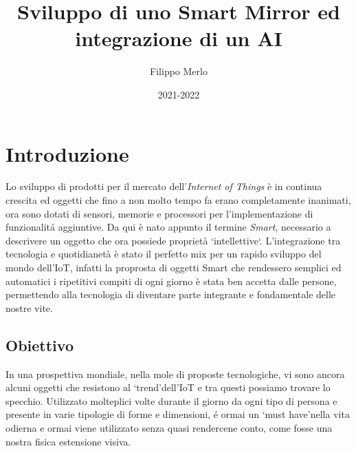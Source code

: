\documentclass[12pt,a4paper]{article}
\title{Sviluppo di uno Smart Mirror ed integrazione di un AI}
\author{Filippo Merlo}
\date{2021-2022}
\begin{document}
\maketitle
\newpage
\tableofcontents
\newpage

\section{Introduzione}

Lo sviluppo di prodotti per il mercato dell'\textit{Internet of Things} \`e in
continua crescita ed oggetti che fino a non molto tempo fa erano completamente
inanimati, ora sono dotati di sensori, memorie e processori per l'implementazione
di funzionalit\'a aggiuntive. Da qui \`e nato appunto il termine \textit{Smart},
necessario a descrivere un oggetto che ora possiede propriet\`a `intellettive`.
L'integrazione tra tecnologia e quotidianet\`a \`e stato il perfetto mix per
un rapido sviluppo del mondo dell'IoT, infatti la proprosta di oggetti Smart che
rendessero semplici ed automatici i ripetitivi compiti di ogni giorno \`e stata
ben accetta dalle persone, permettendo alla tecnologia di diventare parte integrante
e fondamentale delle nostre vite.

\subsection{Obiettivo}

In una prospettiva mondiale, nella mole di proposte tecnologiche, vi sono ancora
alcuni oggetti che resistono al `trend'dell'IoT e tra questi possiamo trovare lo
specchio. Utilizzato molteplici volte durante il giorno da ogni tipo di persona e
presente in varie tipologie di forme e dimensioni, \'e ormai un `must have'nella vita
odierna e ormai viene utilizzato senza quasi rendercene conto, come fosse una nostra
fisica estensione visiva.
\end{document}

